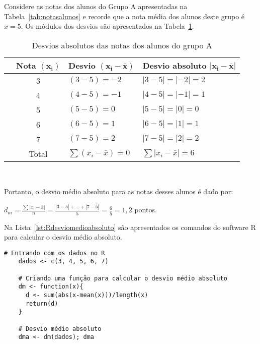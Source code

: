 \documentclass[11pt,fleqn]{book} %
\begin{document}
\vspace{0,3cm}


\begin{example}

Considere as notas dos alunos do Grupo A apresentadas na Tabela~\ref{tab:notasalunos} e recorde que a nota média dos alunos deste grupo é $\bar{x}=5$. Os módulos dos desvios são apresentados na Tabela~\ref{tab:desvioabsoluto}. \\

\begin{table}[h]
	\caption{Desvios absolutos das notas dos alunos do grupo A}
	\label{tab:desvioabsoluto} 
	\vspace{-0.1cm}
	\centering
	\begin{tabular}{l c l l}
	\toprule
	& \textbf{Nota $\bm{(x_i)}$} & \textbf{Desvio $\bm{(x_i-\bar{x})}$} & \textbf{Desvio absoluto $\bm{|x_i-\bar{x}|}$} \\
	\midrule
	& 3 & $(3-5)=-2$ & $|3-5|=|-2|=2$ \\
	& 4 & $(4-5)=-1$ & $|4-5|=|-1|=1$ \\
	& 5 & $(5-5)=0$  & $|5-5|=|0|=0$ \\
	& 6 & $(6-5)=1$  & $|6-5|=|1|=1$ \\
	& 7 & $(7-5)=2$  & $|7-5|=|2|=2$ \\
	\hline
	& Total & $\sum(x_i-\bar{x})=0$ & $\sum|x_i-\bar{x}|=6$ \\
	\bottomrule
	\end{tabular} \\
\end{table}

Portanto, o desvio médio absoluto para as notas desses alunos é dado por:

\begin{center}
$\displaystyle d_m=\frac{\sum|x_i-\bar{x}|}{n} = \frac{|3-5|+...+|7-5|}{5} = \frac{6}{5} = 1,2$ pontos.
\end{center}

\end{example}

\vspace{0,3cm}

\vspace{2cm}

Na Lista~\ref{lst:Rdesviomedioabsoluto} são apresentados os comandos do software R para calcular o desvio médio absoluto. \\

\begin{scriptsize}
	\estiloR
	\begin{lstlisting}[caption={Comandos do software R}, label=lst:Rdesviomedioabsoluto]
	# Entrando com os dados no R
	dados <- c(3, 4, 5, 6, 7)

	# Criando uma função para calcular o desvio médio absoluto
	dm <- function(x){
	  d <- sum(abs(x-mean(x)))/length(x)
	  return(d)
	}

	# Desvio médio absoluto
	dma <- dm(dados); dma

	\end{lstlisting}
\end{scriptsize}
\end{document}

